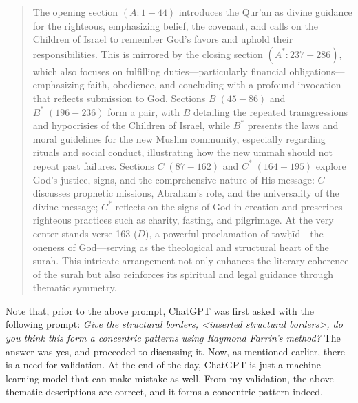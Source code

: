 \begin{quotation}
    The opening section $(A: 1-44)$ introduces the Qur'\=an as divine guidance for the righteous, emphasizing belief, the covenant, and calls on the Children of Israel to remember God's favors and uphold their responsibilities. This is mirrored by the closing section $(A^*: 237-286)$, which also focuses on fulfilling duties—particularly financial obligations—emphasizing faith, obedience, and concluding with a profound invocation that reflects submission to God. Sections $B\;(45-86)$ and $B^*\;(196-236)$ form a pair, with $B$ detailing the repeated transgressions and hypocrisies of the Children of Israel, while $B^*$ presents the laws and moral guidelines for the new Muslim community, especially regarding rituals and social conduct, illustrating how the new ummah should not repeat past failures. Sections $C\;(87-162)$ and $C^*\;(164-195)$ explore God's justice, signs, and the comprehensive nature of His message: $C$ discusses prophetic missions, Abraham's role, and the universality of the divine message; $C^*$ reflects on the signs of God in creation and prescribes righteous practices such as charity, fasting, and pilgrimage. At the very center stands verse 163 ($D$), a powerful proclamation of tawḥīd—the oneness of God—serving as the theological and structural heart of the surah. This intricate arrangement not only enhances the literary coherence of the surah but also reinforces its spiritual and legal guidance through thematic symmetry.
\end{quotation}

Note that, prior to the above prompt, ChatGPT was first asked with the following prompt: \textit{Give the structural borders, <inserted structural borders>, do you think this form a concentric patterns using Raymond Farrin's method?} The answer was yes, and proceeded to discussing it. Now, as mentioned earlier, there is a need for validation. At the end of the day, ChatGPT is just a machine learning model that can make mistake as well. From my validation, the above thematic descriptions are correct, and it forms a concentric pattern indeed.

